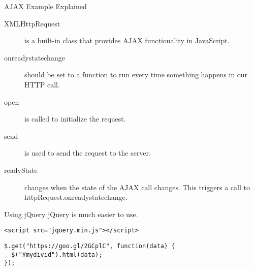 \documentclass{beamer}
\begin{document}
\begin{frame}{AJAX Example Explained}
  \begin{description}
    \item[XMLHttpRequest] is a built-in class that provides AJAX functionality in JavaScript.
    \item[onreadystatechange] should be set to a function to run every time something happens in our HTTP call.
    \item[open] is called to initialize the request.
    \item[send] is used to send the request to the server.
    \item[readyState] changes when the state of the AJAX call changes. This triggers a call to httpRequest.onreadystatechange.
  \end{description}
\end{frame}


\begin{frame}[fragile]{Using jQuery}
jQuery is much easier to use.
\hr
  \begin{verbatim}
<script src="jquery.min.js"></script>
  \end{verbatim}
  \begin{verbatim}
$.get("https://goo.gl/2GCplC", function(data) {
  $("#mydivid").html(data);
});
  \end{verbatim}
\end{frame}
\end{document}
